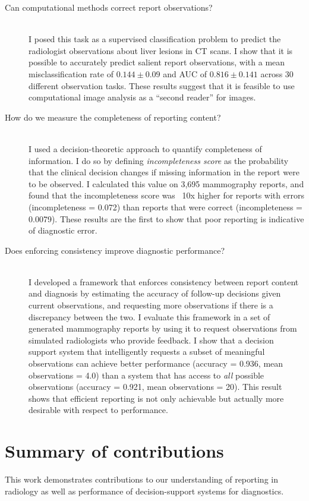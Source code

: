 \begin{description}
	\item[Can computational methods correct report observations?] \hfill \\
	I posed this task as a supervised classification problem to predict the radiologist observations about liver lesions in CT scans. I show that it is possible to accurately predict salient report observations, with a mean misclassification rate of $0.144\pm0.09$ and AUC of $0.816\pm0.141$ across 30 different observation tasks. These results suggest that it is feasible to use computational image analysis as a ``second reader'' for images.
	
	\item[How do we measure the completeness of reporting content?] \hfill \\
	I used a decision-theoretic approach to quantify completeness of information. I do so by defining \emph{incompleteness score} as the probability that the clinical decision changes if missing information in the report were to be observed. I calculated this value on 3,695 mammography reports, and found that the incompleteness score was ~10x higher for reports with errors (incompleteness = 0.072) than reports that were correct (incompleteness = 0.0079). These results are the first to show that poor reporting is indicative of diagnostic error.
	
	\item[Does enforcing consistency improve diagnostic performance?] \hfill \\
	I developed a framework that enforces consistency between report content and diagnosis by estimating the accuracy of follow-up decisions given current observations, and requesting more observations if there is a discrepancy between the two. I evaluate this framework in a set of generated mammography reports by using it to request observations from simulated radiologists who provide feedback. I show that a decision support system that intelligently requests a subset of meaningful observations can achieve better performance (accuracy = 0.936, mean observations = 4.0) than a system that has access to \emph{all} possible observations (accuracy = 0.921, mean observations = 20). This result shows that efficient reporting is not only achievable but actually more desirable with respect to performance.
\end{description}

\section{Summary of contributions}
This work demonstrates contributions to our understanding of reporting in radiology as well as performance of decision-support systems for diagnostics.

